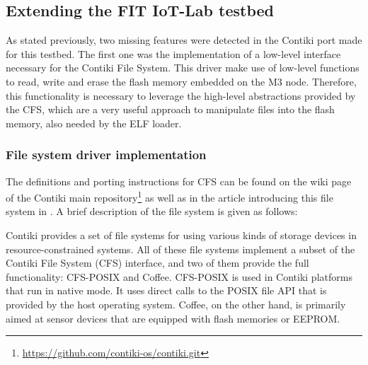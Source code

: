 \subsection{Extending the FIT IoT-Lab testbed}
As stated previously, two missing features were detected in the Contiki port made for this testbed.
The first one was the implementation of a low-level interface necessary for the Contiki File System.
This driver make use of low-level functions to read, write and erase the flash memory embedded on the M3 node.
Therefore, this functionality is necessary to leverage the high-level abstractions provided by the CFS, which are a very useful approach to manipulate files into the flash memory, also needed by the ELF loader.


\subsubsection{File system driver implementation}
The definitions and porting instructions for CFS can be found on the wiki page of the Contiki main repository\footnote{\url{https://github.com/contiki-os/contiki.git}} as well as in the article introducing this file system in \cite{tsiftes09enabling}.
A brief description of the file system is given as follows:

\begin{citeverbatim}
	Contiki provides a set of file systems for using various kinds of storage devices in resource-constrained systems. 
	All of these file systems implement a subset of the Contiki File System (CFS) interface, and two of them provide the full functionality: CFS-POSIX and Coffee.
	CFS-POSIX is used in Contiki platforms that run in native mode. 
	It uses direct calls to the POSIX file API that is provided by the host operating system. 
	Coffee, on the other hand, is primarily aimed at sensor devices that are equipped with flash memories or EEPROM.
\end{citeverbatim}

